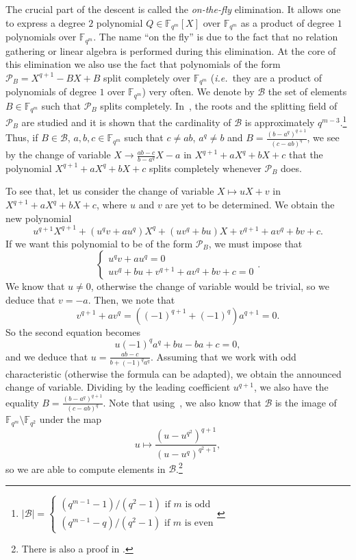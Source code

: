 \documentclass[a4paper,11pt]{article}
\theoremstyle{break}
\theoremstyle{sc}
\theoremstyle{definition}
\theoremstyle{remark}
\newcommand{\ie}{\emph{i.e.\ }}
\begin{document}
The crucial part of the descent is called the \emph{on-the-fly}
elimination. It allows one to express a degree $2$ polynomial
$Q\in\mathbb{F}_{q^m}[X]$ over $\mathbb{F}_{q^m}$ as a product of degree $1$ 
polynomials over $\mathbb{F}_{q^m}$. The name ``on the fly'' is due to the fact
that no relation gathering or linear algebra is performed during this
elimination. At the core of this elimination we also use the fact that 
polynomials of the form $\mathcal P_B = X^{q+1}-BX+B$ split completely over $\mathbb{F}_{q^m}$ (\ie they are a
product of polynomials of degree $1$ over $\mathbb{F}_{q^m}$) very often. We
denote by
$\mathcal B$ the set of elements $B\in \mathbb{F}_{q^m}$ such that $\mathcal
P_B$ splits completely. In~\cite{Bluher04}, the roots and the splitting field of
$\mathcal P_B$ are studied and it is shown that the cardinality of $\mathcal B$
is approximately $q^{m-3}$.\footnote{$|\mathcal B| =
  \begin{cases}(q^{m-1}-1)/(q^2-1)\text{ if }m\text{ is odd}\\
  (q^{m-1}-q)/(q^2-1)\text{ if }m\text{ is even}\end{cases}$} Thus, if $B\in \mathcal B$,
$a,b,c\in\mathbb{F}_{q^m}$ such that $c\neq ab$, $a^q\neq b$ and
$B=\frac{(b-a^q)^{q+1}}{(c-ab)^q}$, we see by the change of variable
$X\to\frac{ab-c}{b-a^q}X-a$ in $X^{q+1}+aX^q+bX+c$ that the polynomial
$X^{q+1}+aX^q+bX+c$ splits completely whenever $\mathcal P_B$ does.

To see that, let us consider the
change of variable $X\mapsto uX+v$ in $X^{q+1}+aX^q+bX+c$, where $u$ and $v$ are
yet to be determined. We obtain the new polynomial
\[
  u^{q+1}X^{q+1}+(u^qv+au^q)X^q+(uv^q+bu)X+v^{q+1}+av^q+bv+c.
\]
If we want this polynomial to be of the form $\mathcal P_B$, we must impose that
\[
\begin{cases}
  u^qv+au^q = 0 \\
  uv^q+bu+v^{q+1}+av^q+bv+c = 0
\end{cases}.
\]
We know that $u\neq0$, otherwise the change of variable would be trivial, so we deduce
that $v=-a$. Then, we note that
\[
  v^{q+1}+av^q=((-1)^{q+1}+(-1)^q)a^{q+1}=0.
\]So
the second equation becomes 
\[
  u(-1)^qa^q+bu-ba+c = 0,
\]
and we deduce that
$u=\frac{ab-c}{b+(-1)^qa^q}$. Assuming that we work with odd characteristic
(otherwise the formula can be adapted), we obtain the announced change of
variable. Dividing by the leading coefficient $u^{q+1}$, we also have the
equality $B = \frac{(b-a^q)^{q+1}}{(c-ab)^q}$.
Note that using~\cite{Bluher04,
HK10, GKZ14}, we also know that $\mathcal B$ is the image of
$\mathbb{F}_{q^m}\setminus\mathbb{F}_{q^2}$ under the map 
\[
  u\mapsto \frac{(u-u^{q^2})^{q+1}}{(u-u^q)^{q^2+1}},
\]
so we are able to compute elements in $\mathcal B$.\footnote{There is also a proof
  in \cite{GKZ16b}.}
\end{document}
